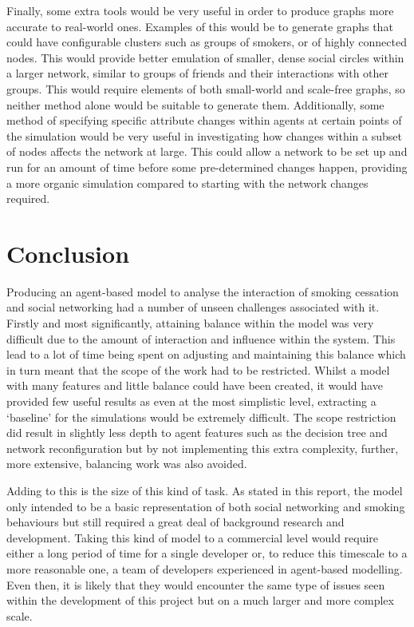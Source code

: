 \documentclass[]{report}
\begin{document}
Finally, some extra tools would be very useful in order to produce graphs more accurate to real-world ones. Examples of this would be to generate graphs that could have configurable clusters such as groups of smokers, or of highly connected nodes. This would provide better emulation of smaller, dense social circles within a larger network, similar to groups of friends and their interactions with other groups. This would require elements of both small-world and scale-free graphs, so neither method alone would be suitable to generate them. Additionally, some method of specifying specific attribute changes within agents at certain points of the simulation would be very useful in investigating how changes within a subset of nodes affects the network at large. This could allow a network to be set up and run for an amount of time before some pre-determined changes happen, providing a more organic simulation compared to starting with the network changes required.


%
%

%
%
\chapter{Conclusion}

Producing an agent-based model to analyse the interaction of smoking cessation and social networking had a number of unseen challenges associated with it. Firstly and most significantly, attaining balance within the model was very difficult due to the amount of interaction and influence within the system. This lead to a lot of time being spent on adjusting and maintaining this balance which in turn meant that the scope of the work had to be restricted. Whilst a model with many features and little balance could have been created, it would have provided few useful results as even at the most simplistic level, extracting a `baseline' for the simulations would be extremely difficult. The scope restriction did result in slightly less depth to agent features such as the decision tree and network reconfiguration but by not implementing this extra complexity, further, more extensive, balancing work was also avoided.

Adding to this is the size of this kind of task. As stated in this report, the model only intended to be a basic representation of both social networking and smoking behaviours but still required a great deal of background research and development. Taking this kind of model to a commercial level would require either a long period of time for a single developer or, to reduce this timescale to a more reasonable one, a team of developers experienced in agent-based modelling. Even then, it is likely that they would encounter the same type of issues seen within the development of this project but on a much larger and more complex scale.
\end{document}
